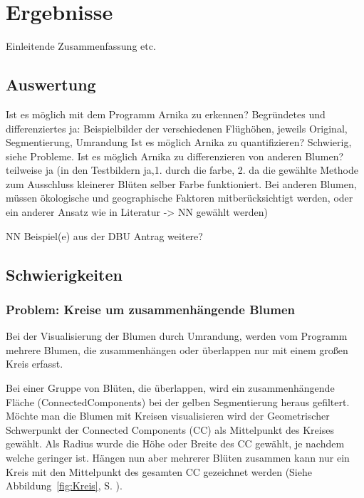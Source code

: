 \section{Ergebnisse}

Einleitende Zusammenfassung etc.
\subsection{Auswertung}

Ist es möglich mit dem Programm Arnika zu erkennen? Begründetes und differenziertes ja: Beispielbilder der verschiedenen Flüghöhen, jeweils Original, Segmentierung, Umrandung
Ist es möglich Arnika zu quantifizieren? Schwierig, siehe Probleme. 
Ist es möglich Arnika zu differenzieren von anderen Blumen? teilweise ja (in den Testbildern ja,1. durch die farbe, 2. da die gewählte Methode zum Ausschluss kleinerer Blüten selber Farbe funktioniert. Bei anderen Blumen, müssen ökologische und geographische Faktoren mitberücksichtigt werden, oder ein anderer Ansatz wie in Literatur -> NN gewählt werden)


NN Beispiel(e) aus der DBU Antrag
weitere?

\subsection{Schwierigkeiten}
\subsubsection{Problem: Kreise um zusammenhängende Blumen}

Bei der Visualisierung der Blumen durch Umrandung, werden vom Programm mehrere Blumen, die zusammenhängen oder überlappen nur mit einem großen Kreis erfasst.

Bei einer Gruppe von Blüten, die überlappen, wird ein zusammenhängende Fläche (ConnectedComponents) bei der gelben Segmentierung heraus gefiltert. Möchte man die Blumen mit Kreisen visualisieren wird der Geometrischer Schwerpunkt der Connected Components (CC) als Mittelpunkt des Kreises gewählt. Als Radius wurde die Höhe oder Breite des CC gewählt, je nachdem welche geringer ist. Hängen nun aber mehrerer Blüten zusammen kann nur ein Kreis mit den Mittelpunkt des gesamten CC gezeichnet werden (Siehe Abbildung~\ref{fig:Kreis}, S. \pageref{fig:Kreis}).
 
